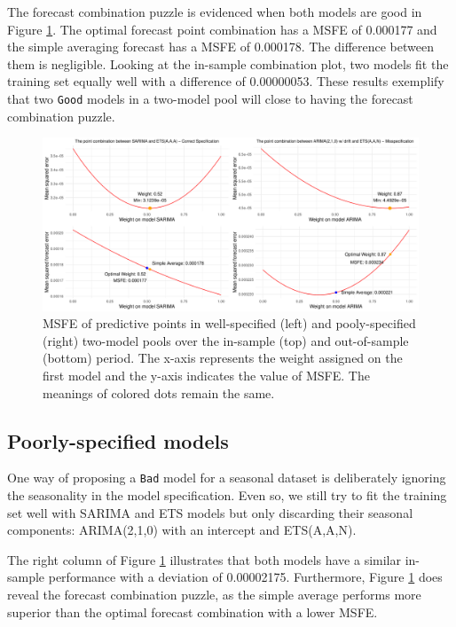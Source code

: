 \documentclass{monashthesis}
\begin{document}
The forecast combination puzzle is evidenced when both models are good in Figure \ref{fig:sd}. The optimal forecast point combination has a MSFE of 0.000177 and the simple averaging forecast has a MSFE of 0.000178. The difference between them is negligible. Looking at the in-sample combination plot, two models fit the training set equally well with a difference of 0.00000053. These results exemplify that two \texttt{Good} models in a two-model pool will close to having the forecast combination puzzle.

\begin{figure}[ht]
\centering
\includegraphics[scale=0.5]{figures/EMPL.pdf}
\caption{MSFE of predictive points in well-specified (left) and pooly-specified (right) two-model pools over the in-sample (top) and out-of-sample (bottom) period. The x-axis represents the weight assigned on the first model and the y-axis indicates the value of MSFE. The meanings of colored dots remain the same.}
\label{fig:sd}
\end{figure}

\hypertarget{poorly-specified-models}{%
\subsection{Poorly-specified models}\label{poorly-specified-models}}

One way of proposing a \texttt{Bad} model for a seasonal dataset is deliberately ignoring the seasonality in the model specification. Even so, we still try to fit the training set well with SARIMA and ETS models but only discarding their seasonal components: ARIMA(2,1,0) with an intercept and ETS(A,A,N).

The right column of Figure \ref{fig:sd} illustrates that both models have a similar in-sample performance with a deviation of 0.00002175. Furthermore, Figure \ref{fig:sd} does reveal the forecast combination puzzle, as the simple average performs more superior than the optimal forecast combination with a lower MSFE.
\end{document}
